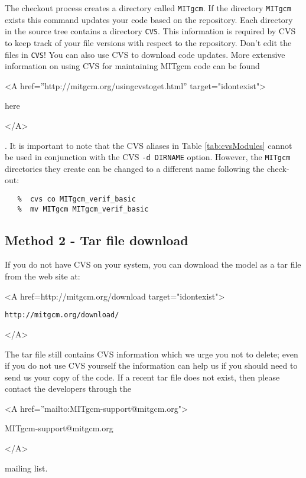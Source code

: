 The checkout process creates a directory called \texttt{MITgcm}. If
the directory \texttt{MITgcm} exists this command updates your code
based on the repository. Each directory in the source tree contains a
directory \texttt{CVS}. This information is required by CVS to keep
track of your file versions with respect to the repository. Don't edit
the files in \texttt{CVS}!  You can also use CVS to download code
updates.  More extensive information on using CVS for maintaining
MITgcm code can be found
\begin{rawhtml} <A href=''http://mitgcm.org/usingcvstoget.html'' target="idontexist"> \end{rawhtml}
here
\begin{rawhtml} </A> \end{rawhtml} 
.
It is important to note that the CVS aliases in Table
\ref{tab:cvsModules} cannot be used in conjunction with the CVS
\texttt{-d DIRNAME} option.  However, the \texttt{MITgcm} directories
they create can be changed to a different name following the check-out:
\begin{verbatim}
   %  cvs co MITgcm_verif_basic
   %  mv MITgcm MITgcm_verif_basic
\end{verbatim}


\subsection{Method 2 - Tar file download}
\label{sect:conventionalDownload}

If you do not have CVS on your system, you can download the model as a
tar file from the web site at:
\begin{rawhtml} <A href=http://mitgcm.org/download target="idontexist"> \end{rawhtml}
\begin{verbatim}
http://mitgcm.org/download/
\end{verbatim}
\begin{rawhtml} </A> \end{rawhtml}
The tar file still contains CVS information which we urge you not to
delete; even if you do not use CVS yourself the information can help
us if you should need to send us your copy of the code.  If a recent
tar file does not exist, then please contact the developers through
the 
\begin{rawhtml} <A href=''mailto:MITgcm-support@mitgcm.org"> \end{rawhtml}
MITgcm-support@mitgcm.org
\begin{rawhtml} </A> \end{rawhtml}
mailing list.

